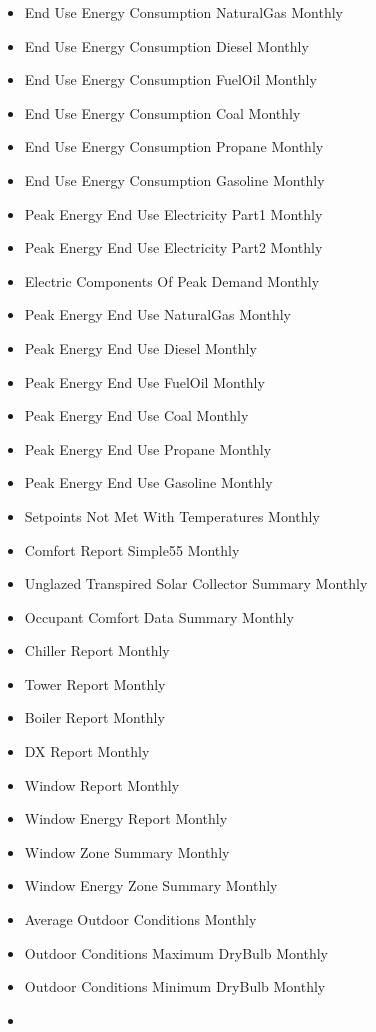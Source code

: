 \begin{itemize}
  End Use Energy Consumption Electricity Monthly
\item
  End Use Energy Consumption NaturalGas Monthly
\item
  End Use Energy Consumption Diesel Monthly
\item
  End Use Energy Consumption FuelOil Monthly
\item
  End Use Energy Consumption Coal Monthly
\item
  End Use Energy Consumption Propane Monthly
\item
  End Use Energy Consumption Gasoline Monthly
\item
  Peak Energy End Use Electricity Part1 Monthly
\item
  Peak Energy End Use Electricity Part2 Monthly
\item
  Electric Components Of Peak Demand Monthly
\item
  Peak Energy End Use NaturalGas Monthly
\item
  Peak Energy End Use Diesel Monthly
\item
  Peak Energy End Use FuelOil Monthly
\item
  Peak Energy End Use Coal Monthly
\item
  Peak Energy End Use Propane Monthly
\item
  Peak Energy End Use Gasoline Monthly
\item
  Setpoints Not Met With Temperatures Monthly
\item
  Comfort Report Simple55 Monthly
\item
  Unglazed Transpired Solar Collector Summary Monthly
\item
  Occupant Comfort Data Summary Monthly
\item
  Chiller Report Monthly
\item
  Tower Report Monthly
\item
  Boiler Report Monthly
\item
  DX Report Monthly
\item
  Window Report Monthly
\item
  Window Energy Report Monthly
\item
  Window Zone Summary Monthly
\item
  Window Energy Zone Summary Monthly
\item
  Average Outdoor Conditions Monthly
\item
  Outdoor Conditions Maximum DryBulb Monthly
\item
  Outdoor Conditions Minimum DryBulb Monthly
\item

\end{itemize}
